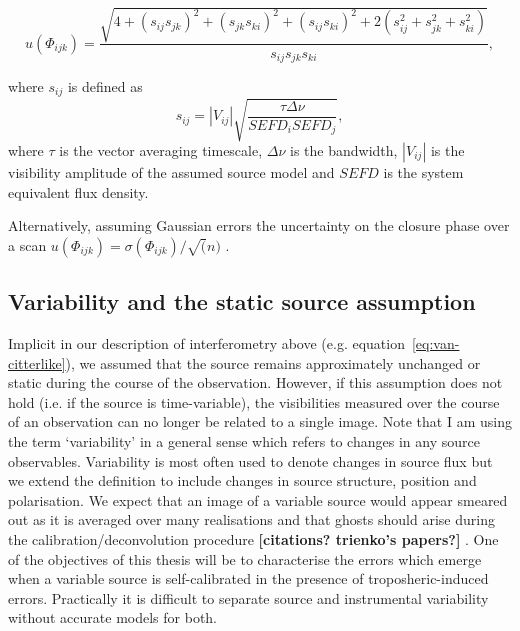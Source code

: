 \begin{equation}\label{eq:ucp}
u(\Phi_{ijk}) = \frac{\sqrt{4 + (s_{ij}s_{jk})^2 + (s_{jk}s_{ki})^2 + (s_{ij}s_{ki})^2 +
                        2(s_{ij}^2+s_{jk}^2+s_{ki}^2)}}{s_{ij}s_{jk}s_{ki}},
\end{equation}

\noindent where $s_{ij}$ is defined as
\begin{equation}
s_{ij}=|V_{ij}| \sqrt{\frac{ \tau \Delta \nu}{SEFD_i SEFD_j}},
\end{equation}
where $\tau$ is the vector averaging timescale, $\Delta \nu$ is the bandwidth, $|V_{ij}|$ is the visibility amplitude of the assumed source model and $SEFD$ is the system equivalent flux density.

Alternatively, assuming Gaussian errors the uncertainty on the closure phase over a scan $u(\Phi_{ijk})=\sigma(\Phi_{ijk})/\sqrt(n)$  \citep{Brinkerink_2016}.

\subsection{Variability and the static source assumption}\label{sec:variability}

Implicit in our description of interferometry above (e.g. equation~\ref{eq:van-citterlike}), we assumed that the source remains approximately unchanged or static during the course of the observation. However, if this assumption does not hold (i.e. if the source is time-variable), the visibilities measured over the course of an observation can no longer be related to a single image.
Note that I am using the term `variability' in a general sense which refers to changes in any source observables. Variability is most often used to denote changes in source flux but we extend the definition to include changes in source structure, position and polarisation.
We expect that an image of a variable source would appear smeared out as it is averaged over many realisations and that ghosts should arise during the calibration/deconvolution procedure {\bf [citations? trienko's papers?]} . One of the objectives of this thesis will be to characterise the errors which emerge when a variable source is self-calibrated in the presence of troposheric-induced errors. Practically it is difficult to separate source and instrumental variability without accurate models for both. 


